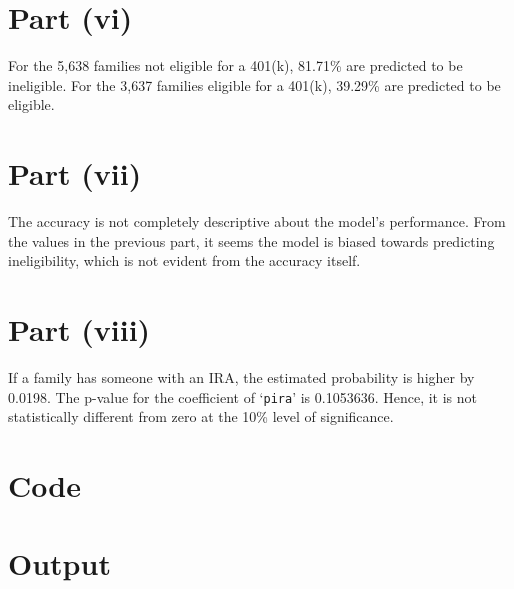 \documentclass{./solution}
\begin{document}
\begin{solution}[Wooldridge C7.9]
        \section*{Part (vi)}
            For the 5,638 families not eligible for a 401(k), 81.71\% are predicted to be ineligible.
            For the 3,637 families eligible for a 401(k), 39.29\% are predicted to be eligible.

        \section*{Part (vii)}
            The accuracy is not completely descriptive about the model's performance.
            From the values in the previous part, it seems the model is biased towards predicting ineligibility, which is not evident from the accuracy itself.

        \section*{Part (viii)}
            If a family has someone with an IRA, the estimated probability is higher by 0.0198.
            The p-value for the coefficient of `\texttt{pira}' is 0.1053636.
            Hence, it is not statistically different from zero at the 10\% level of significance.

        \section*{Code}

        \section*{Output}
    \end{solution}
\end{document}

